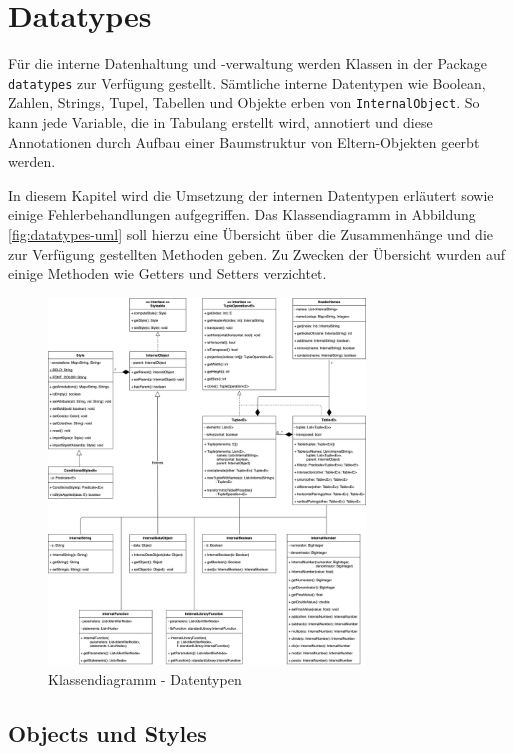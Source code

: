 \pagebreak

\section{Datatypes}

Für die interne Datenhaltung und -verwaltung werden Klassen in der
Package \lstinline{datatypes} zur Verfügung gestellt. Sämtliche
interne Datentypen wie Boolean, Zahlen, Strings, Tupel, Tabellen
und Objekte erben von \lstinline{InternalObject}. So kann jede Variable, die
in Tabulang erstellt wird, annotiert und diese Annotationen durch
Aufbau einer Baumstruktur von Eltern-Objekten geerbt werden.

In diesem Kapitel wird die Umsetzung der internen Datentypen erläutert
sowie einige Fehlerbehandlungen aufgegriffen. Das Klassendiagramm in 
Abbildung \ref{fig:datatypes-uml} soll hierzu eine Übersicht über die
Zusammenhänge und die zur Verfügung gestellten Methoden geben. Zu Zwecken
der Übersicht wurden auf einige Methoden wie Getters und Setters verzichtet.

\begin{figure}[h]
\centering
\includegraphics[width=0.75\textwidth]{images/datatypes-uml.png}
\caption{Klassendiagramm - Datentypen}
\end{figure}\label{fig:datatypes-uml}

\subsection{Objects und Styles}

